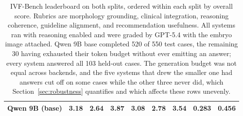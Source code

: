 \documentclass[11pt]{article}
\begin{document}
\begin{table}[H]
\begin{tabular}{lcccccccc}
Qwen 9B (base) & 3.18 & 2.64 & 3.87 & 3.08 & 2.78 & 3.54 & 0.283 & 0.456 \\
\bottomrule
\end{tabular}
\caption{IVF-Bench leaderboard on both splits, ordered within each split by
overall score. Rubrics are morphology grounding, clinical integration, reasoning
coherence, guideline alignment, and recommendation usefulness. All systems ran
with reasoning enabled and were graded by GPT-5.4 with the embryo image
attached. Qwen 9B base completed 520 of 550 test cases, the remaining 30 having
exhausted their token budget without ever emitting an answer;
every system answered all 103 held-out cases. The generation budget was not equal
across backends, and the five systems that drew the smaller one had answers cut
off on some cases while the other three never did, which
Section~\ref{sec:robustness} quantifies and which affects these rows unevenly.}
\label{tab:leaderboard}
\end{table}
\end{document}
